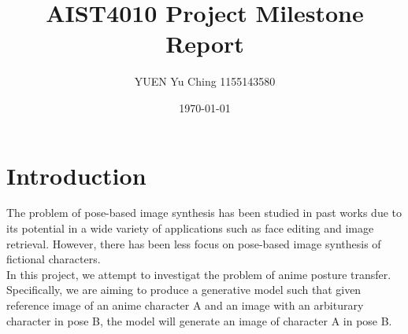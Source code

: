 \documentclass{article}
\title{AIST4010 Project Milestone Report}
\author{YUEN Yu Ching 1155143580}
\date{\today}
\begin{document}
\maketitle
\section{Introduction}
The problem of pose-based image synthesis has been studied in past works due to its potential in a wide variety of applications such as face editing and image retrieval. However, there has been less focus on pose-based image synthesis of fictional characters.\\
In this project, we attempt to investigat the problem of anime posture transfer. Specifically, we are aiming to produce a generative model such that given reference image of an anime character A and an image with an arbiturary character in pose B, the model will generate an image of character A in pose B.
\end{document}
